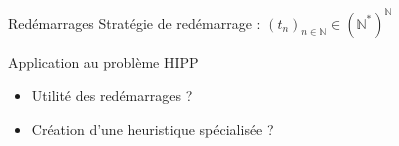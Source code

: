 \documentclass{beamer}
\begin{document}
\begin{frame}
    \begin{block}{Redémarrages}
        Stratégie de redémarrage : $(t_n)_{n\in\mathbb{N}}\in(\mathbb{N}^*)^\mathbb{N}$
    \end{block}

    \begin{exampleblock}{Application au problème HIPP}
        \begin{itemize}
            \item Utilité des redémarrages ?
            \item Création d'une heuristique spécialisée ?
        \end{itemize}
    \end{exampleblock}
\end{frame}
\end{document}
